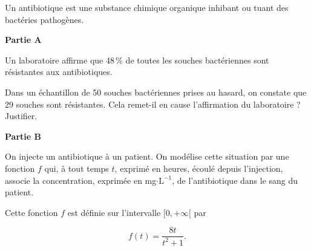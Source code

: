 \documentclass[10pt,a4paper,french]{article}
\begin{document}
Un antibiotique est une substance chimique organique inhibant ou tuant des bactéries pathogènes.

\medskip

\textbf{Partie A}

\medskip

Un laboratoire affirme que 48\,\% de toutes les souches bactériennes sont résistantes aux antibiotiques.

Dans un échantillon de 50 souches bactériennes prises au hasard, on constate que 29 souches sont
résistantes. Cela remet-il en cause l’affirmation du laboratoire ? Justifier.

\medskip

\textbf{Partie B}

\medskip

On injecte un antibiotique à un patient. On modélise cette situation par une fonction $f$ qui, à tout temps $t$,
exprimé en heures, écoulé depuis l’injection, associe la concentration, exprimée en mg$\cdot \text{L}^{-1}$, de
l’antibiotique dans le sang du patient.

Cette fonction $f$ est définie sur l’intervalle $[0, +\infty[$ par 

\[f (t)=\dfrac{8t}{t^2+1}.\]
\end{document}

